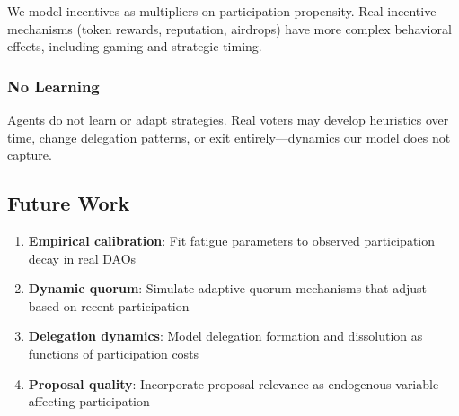 We model incentives as multipliers on participation propensity. Real incentive mechanisms (token rewards, reputation, airdrops) have more complex behavioral effects, including gaming and strategic timing.

\subsubsection{No Learning}

Agents do not learn or adapt strategies. Real voters may develop heuristics over time, change delegation patterns, or exit entirely---dynamics our model does not capture.

\subsection{Future Work}

\begin{enumerate}
    \item \textbf{Empirical calibration}: Fit fatigue parameters to observed participation decay in real DAOs
    \item \textbf{Dynamic quorum}: Simulate adaptive quorum mechanisms that adjust based on recent participation
    \item \textbf{Delegation dynamics}: Model delegation formation and dissolution as functions of participation costs
    \item \textbf{Proposal quality}: Incorporate proposal relevance as endogenous variable affecting participation
\end{enumerate}
